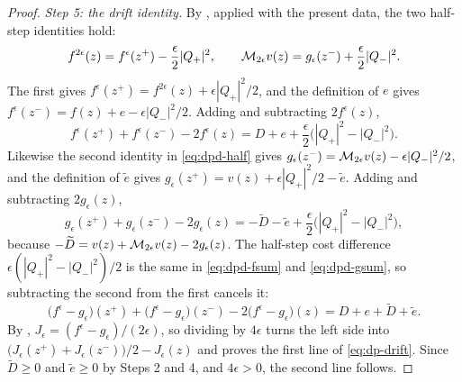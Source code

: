 \begin{proof}
\emph{Step 5: the drift identity.}
By , applied with the present data, the two half-step
identities hold:
\begin{equation}\label{eq:dpd-half}
  f^{2\epsilon}(z)=f^\epsilon(z^+)-\frac{\epsilon}{2}|Q_+|^2,\qquad
  \mathcal{M}_{2\epsilon}v(z)=g_\epsilon(z^-)+\frac{\epsilon}{2}|Q_-|^2 .
\end{equation}
The first gives
$f^\epsilon(z^+)=f^{2\epsilon}(z)+\epsilon|Q_+|^2/2$, and the definition of
$e$ gives $f^\epsilon(z^-)=f(z)+e-\epsilon|Q_-|^2/2$. Adding and subtracting
$2f^\epsilon(z)$,
\begin{equation}\label{eq:dpd-fsum}
  f^\epsilon(z^+)+f^\epsilon(z^-)-2f^\epsilon(z)
   =D+e+\frac{\epsilon}{2}\bigl(|Q_+|^2-|Q_-|^2\bigr).
\end{equation}
Likewise the second identity in \eqref{eq:dpd-half} gives
$g_\epsilon(z^-)=\mathcal{M}_{2\epsilon}v(z)-\epsilon|Q_-|^2/2$, and the definition
of $\widetilde e$ gives
$g_\epsilon(z^+)=v(z)+\epsilon|Q_+|^2/2-\widetilde e$. Adding and subtracting
$2g_\epsilon(z)$,
\begin{equation}\label{eq:dpd-gsum}
  g_\epsilon(z^+)+g_\epsilon(z^-)-2g_\epsilon(z)
   =-\widetilde D-\widetilde e
     +\frac{\epsilon}{2}\bigl(|Q_+|^2-|Q_-|^2\bigr),
\end{equation}
because $-\widetilde D=v(z)+\mathcal{M}_{2\epsilon}v(z)-2g_\epsilon(z)$. The half-step
cost difference $\epsilon(|Q_+|^2-|Q_-|^2)/2$ is the same in
\eqref{eq:dpd-fsum} and \eqref{eq:dpd-gsum}, so subtracting the second from the
first cancels it:
\[
  \bigl(f^\epsilon-g_\epsilon\bigr)(z^+)
   +\bigl(f^\epsilon-g_\epsilon\bigr)(z^-)
   -2\bigl(f^\epsilon-g_\epsilon\bigr)(z)
   =D+e+\widetilde D+\widetilde e .
\]
By , $J_\epsilon=(f^\epsilon-g_\epsilon)/(2\epsilon)$, so
dividing by $4\epsilon$ turns the left side into
$\bigl(J_\epsilon(z^+)+J_\epsilon(z^-)\bigr)/2-J_\epsilon(z)$ and proves the
first line of \eqref{eq:dp-drift}. Since $\widetilde D\ge0$ and
$\widetilde e\ge0$ by Steps 2 and 4, and $4\epsilon>0$, the second line
follows.


\end{proof}

